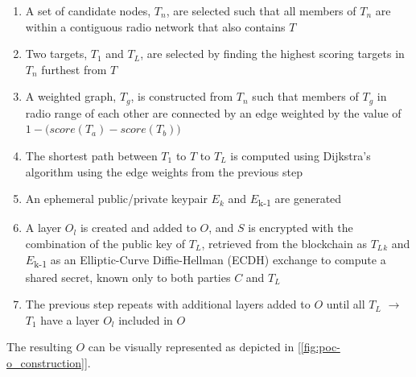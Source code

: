 \documentclass[10pt, nonatbib, nocopyrightspace, reprint]{sigplanconf}
\newcommand{\figref}[1]{[\autoref{#1}]}
\begin{document}
\begin{enumerate}
  \item A set of candidate nodes, $T_n$, are selected such that all members of $T_n$ are within a contiguous radio network that also contains $T$
  \item Two targets, $T_1$ and $T_L$, are selected by finding the highest scoring targets in $T_n$ furthest from $T$
  \item A weighted graph, $T_g$, is constructed from $T_n$ such that members of $T_g$ in radio range of each other are connected by an edge weighted by the value of \(1 - \Big({score(T_a) - score(T_b)}\Big)\)
  \item The shortest path between $T_1$ to $T$ to $T_L$ is computed using Dijkstra's algorithm\cite{dijkstra} using the edge weights from the previous step
	\item An ephemeral public/private keypair $E_k$ and $E$\textsubscript{k-1} are generated
	\item A layer $O_l$ is created and added to $O$, and $S$ is encrypted with the combination of the public key of $T_L$, retrieved from the blockchain as $T_L$$_k$ and $E$\textsubscript{k-1} as an Elliptic-Curve Diffie-Hellman (ECDH) exchange to compute a shared secret, known only to both parties $C$ and $T_L$
  \item The previous step repeats with additional layers added to $O$ until all $T_L$ $\rightarrow$ $T_1$ have a layer $O_l$ included in $O$
\end{enumerate}

The resulting $O$ can be visually represented as depicted in \figref{fig:poc-o_construction}.
\end{document}
